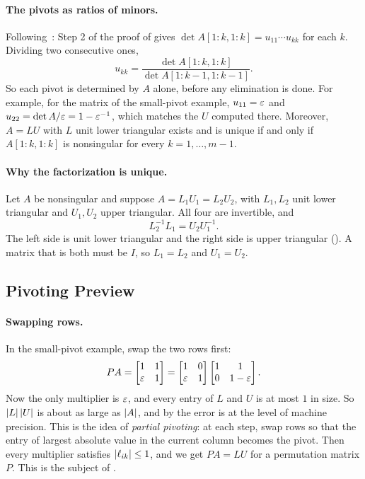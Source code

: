 \paragraph{The pivots as ratios of minors.} Following~\cite[\S2.3]{Demmel}: Step 2 of the proof of  gives $\det A[1{:}k, 1{:}k] = u_{11} \cdots u_{kk}$ for each $k$. Dividing two consecutive ones,
\begin{equation}
  u_{kk} = \frac{\det A[1{:}k, 1{:}k]}{\det A[1{:}k{-}1, 1{:}k{-}1]}.
\end{equation}
So each pivot is determined by $A$ alone, before any elimination is done. For example, for the matrix of the small-pivot example, $u_{11} = \varepsilon$ and $u_{22} = \det A/\varepsilon = 1 - \varepsilon^{-1}$, which matches the $U$ computed there. Moreover, $A = LU$ with $L$ unit lower triangular exists and is unique if and only if $A[1{:}k, 1{:}k]$ is nonsingular for every $k = 1, \dots, m - 1$.

\paragraph{Why the factorization is unique.} Let $A$ be nonsingular and suppose $A = L_1U_1 = L_2U_2$, with $L_1, L_2$ unit lower triangular and $U_1, U_2$ upper triangular. All four are invertible, and
\begin{equation}
  L_2^{-1}L_1 = U_2U_1^{-1}.
\end{equation}
The left side is unit lower triangular and the right side is upper triangular (). A matrix that is both must be $I$, so $L_1 = L_2$ and $U_1 = U_2$.

\subsection{Pivoting Preview}

\paragraph{Swapping rows.} In the small-pivot example, swap the two rows first:
\begin{equation}
  PA = \begin{bmatrix} 1 & 1 \\ \varepsilon & 1 \end{bmatrix} =
  \begin{bmatrix} 1 & 0 \\ \varepsilon & 1 \end{bmatrix}
  \begin{bmatrix} 1 & 1 \\ 0 & 1 - \varepsilon \end{bmatrix}.
\end{equation}
Now the only multiplier is $\varepsilon$, and every entry of $L$ and $U$ is at most $1$ in size. So $\left\lvert L \right\rvert\left\lvert U \right\rvert$ is about as large as $\left\lvert A \right\rvert$, and by  the error is at the level of machine precision. This is the idea of \emph{partial pivoting}: at each step, swap rows so that the entry of largest absolute value in the current column becomes the pivot. Then every multiplier satisfies $\left\lvert \ell_{ik} \right\rvert \le 1$, and we get $PA = LU$ for a permutation matrix $P$. This is the subject of .

